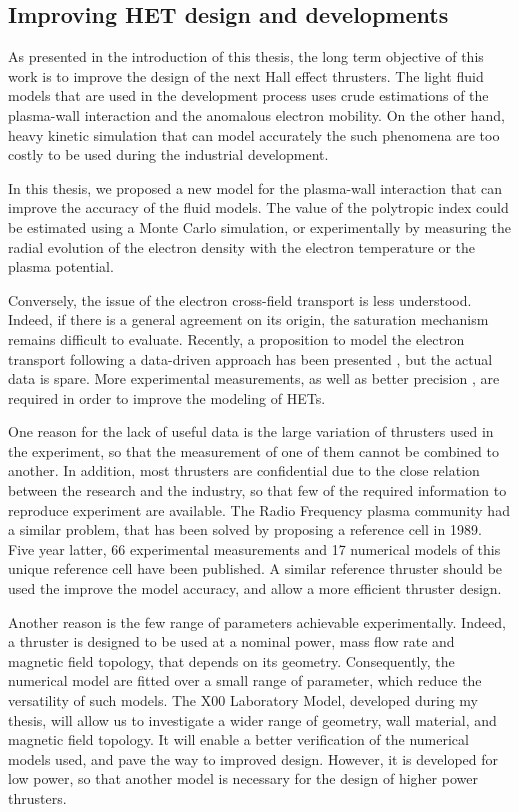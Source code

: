 \subsection{Improving HET design and developments } 

As presented in the introduction of this thesis, the long term objective of this work is to improve the design of the next Hall effect thrusters.
The light fluid models that are used in the development process uses crude estimations of the plasma-wall interaction and the anomalous electron mobility.
On the other hand, heavy kinetic simulation that can model accurately the such phenomena are too costly to be used during the industrial development.

In this thesis, we proposed a new model for the plasma-wall interaction that can improve the accuracy of the fluid models.
The value of the polytropic index could be estimated using a Monte Carlo simulation, or experimentally by measuring the radial evolution of the electron density with the electron temperature or the plasma potential. 

Conversely, the issue of the electron cross-field transport is less understood.
Indeed, if there is a general agreement on its origin, the saturation mechanism remains difficult to evaluate.
Recently, a proposition to model the electron transport following a data-driven approach has been presented \citep{jorns2018}, but the actual data is spare.
More experimental measurements, as well as better precision \citep{mikellides2019}, are required in order to improve the modeling of HETs.

One reason for the lack of useful data is the large variation of thrusters used in the experiment, so that the measurement of one of them cannot be combined to another.
In addition, most thrusters are confidential due to the close relation between the research and the industry, so that few of the required information to reproduce experiment are available.
The Radio Frequency plasma community had a similar problem, that has been solved by proposing a reference cell in 1989\citep{olthoff1995}.
Five year latter, 66 experimental measurements and 17 numerical models of this unique reference cell have been published.
A similar reference thruster should be used the improve the model accuracy, and allow a more efficient thruster design.

Another reason is the few range of parameters achievable experimentally.
Indeed, a thruster is designed to be used at a nominal power, mass flow rate and magnetic field topology, that depends on its geometry.
Consequently, the numerical model are fitted over a small range of parameter, which reduce the versatility of such models.
The \PPS X00 Laboratory Model, developed during my thesis, will allow us to investigate a wider range of geometry, wall material, and magnetic field topology.
It will enable a better verification of the numerical models used, and pave the way to improved design.
However, it is developed for low power, so that another model is necessary for the design of higher power thrusters. 


